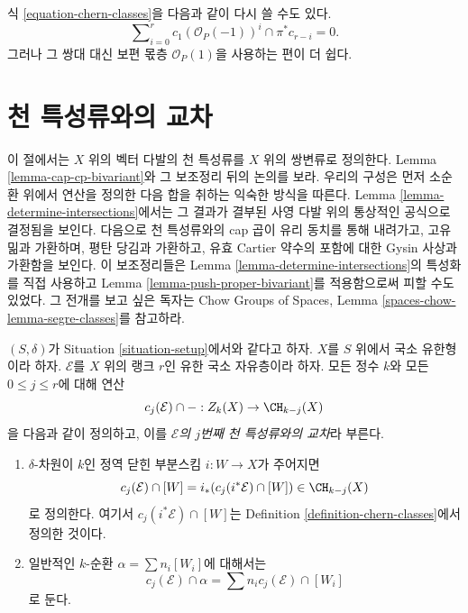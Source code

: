 \begin{remark}
\label{remark-equation-signs}
식 \ref{equation-chern-classes}을 다음과 같이 다시 쓸 수도 있다.
\begin{equation}
\label{equation-signs}
\sum\nolimits_{i = 0}^r
c_1(\mathcal{O}_P(-1))^i \cap \pi^*c_{r - i}
= 0.
\end{equation}
그러나 그 쌍대 대신 보편 몫층 $\mathcal{O}_P(1)$을 사용하는 편이 더
쉽다.
\end{remark}




\section{천 특성류와의 교차}
\label{section-intersecting-chern-classes}

\noindent
이 절에서는 $X$ 위의 벡터 다발의 천 특성류를 $X$ 위의 쌍변류로
정의한다. Lemma \ref{lemma-cap-cp-bivariant}와 그 보조정리 뒤의 논의를
보라. 우리의 구성은 먼저 소순환 위에서 연산을 정의한 다음 합을 취하는
익숙한 방식을 따른다. Lemma \ref{lemma-determine-intersections}에서는
그 결과가 결부된 사영 다발 위의 통상적인 공식으로 결정됨을 보인다.
다음으로 천 특성류와의 cap 곱이 유리 동치를 통해 내려가고, 고유 밂과
가환하며, 평탄 당김과 가환하고, 유효 Cartier 약수의 포함에 대한 Gysin
사상과 가환함을 보인다. 이 보조정리들은 Lemma
\ref{lemma-determine-intersections}의 특성화를 직접 사용하고 Lemma
\ref{lemma-push-proper-bivariant}를 적용함으로써 피할 수도 있었다.
그 전개를 보고 싶은 독자는 Chow Groups of Spaces, Lemma
\ref{spaces-chow-lemma-segre-classes}를 참고하라.

\begin{definition}
\label{definition-cap-chern-classes}
$(S, \delta)$가 Situation \ref{situation-setup}에서와 같다고 하자.
$X$를 $S$ 위에서 국소 유한형이라 하자. $\mathcal{E}$를 $X$ 위의
랭크 $r$인 유한 국소 자유층이라 하자. 모든 정수 $k$와 모든
$0 \leq j \leq r$에 대해 연산
$$
c_j(\mathcal{E}) \cap - : Z_k(X) \to \CH_{k - j}(X)
$$
을 다음과 같이 정의하고, 이를
{\it $\mathcal{E}$의 $j$번째 천 특성류와의 교차}라 부른다.
\begin{enumerate}
\item $\delta$-차원이 $k$인 정역 닫힌 부분스킴 $i : W \to X$가
주어지면
$$
c_j(\mathcal{E}) \cap [W] = i_*(c_j({i^*\mathcal{E}}) \cap [W])
\in
\CH_{k - j}(X)
$$
로 정의한다. 여기서 $c_j({i^*\mathcal{E}}) \cap [W]$는
Definition \ref{definition-chern-classes}에서 정의한 것이다.
\item 일반적인 $k$-순환 $\alpha = \sum n_i [W_i]$에 대해서는
$$
c_j(\mathcal{E}) \cap \alpha = \sum n_i c_j(\mathcal{E}) \cap [W_i]
$$
로 둔다.
\end{enumerate}
\end{definition}

